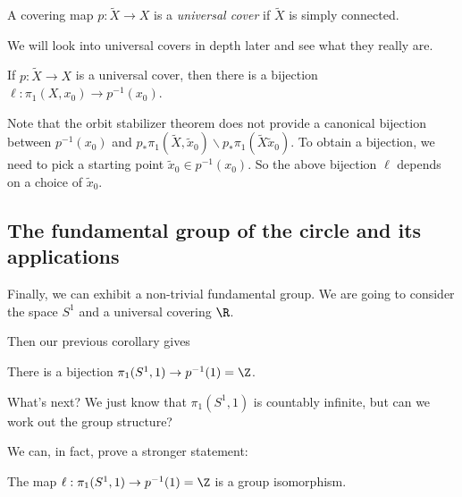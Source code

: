 \documentclass[a4paper]{article}
\begin{document}
\begin{defi}
  A covering map $p: \tilde{X} \to X$ is a \emph{universal cover} if $\tilde{X}$ is simply connected.
\end{defi}
We will look into universal covers in depth later and see what they really are.

\begin{cor}
  If $p: \tilde{X} \to X$ is a universal cover, then there is a bijection $\ell: \pi_1(X, x_0) \to p^{-1}(x_0)$.
\end{cor}
Note that the orbit stabilizer theorem does not provide a canonical bijection between $p^{-1}(x_0)$ and $p_* \pi_1(\tilde{X}, \tilde{x}_0)\backslash p_* \pi_1(\tilde{X}\tilde{x}_0)$. To obtain a bijection, we need to pick a starting point $\tilde{x}_0 \in p^{-1}(x_0)$. So the above bijection $\ell$ depends on a choice of $\tilde{x}_0$.

\subsection{The fundamental group of the circle and its applications}
Finally, we can exhibit a non-trivial fundamental group. We are going to consider the space $S^1$ and a universal covering $\R$.
\begin{center}
\end{center}
Then our previous corollary gives
\begin{cor}
  There is a bijection $\pi_1(S^1, 1) \to p^{-1}(1) = \Z$.
\end{cor}
What's next? We just know that $\pi_1(S^1, 1)$ is countably infinite, but can we work out the group structure?

We can, in fact, prove a stronger statement:
\begin{thm}
  The map $\ell: \pi_1(S^1, 1) \to p^{-1}(1) = \Z$ is a group isomorphism.
\end{thm}
\end{document}
